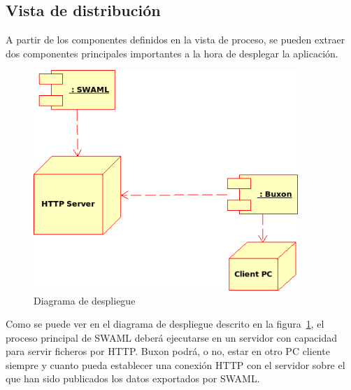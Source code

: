 
\subsection{Vista de distribución}

A partir de los componentes definidos en la vista de proceso,
se pueden extraer dos componentes principales importantes a la
hora de desplegar la aplicación.

\begin{figure}[H]
	\centering
	\includegraphics[width=10cm]{images/uml/despliegue.png}
	\caption{Diagrama de despliegue}
	\label{fig:uml:despliegue}
\end{figure}

Como se puede ver en el diagrama de despliegue descrito en la 
figura~\ref{fig:uml:despliegue}, el proceso principal de SWAML 
deberá ejecutarse en un servidor con capacidad para servir 
ficheros por HTTP. Buxon podrá, o no, estar en otro PC cliente
siempre y cuanto pueda establecer una conexión HTTP con el servidor
sobre el que han sido publicados los datos exportados por SWAML.